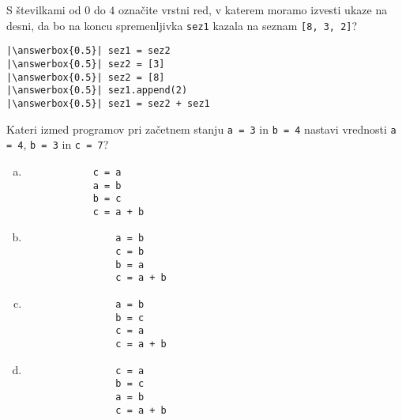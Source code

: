 \documentclass[arhiv, 10pt]{../izpit}
\newcommand{\inlinepy}[1]{\texttt{#1}}
\newcommand{\answerbox}[1]{\framebox{\vphantom{\large M}\hspace{#1cm}}}
\begin{document}
        \naloga*
        \begin{multicols}{2}
        \noindent 
        S številkami od $0$ do $4$ označite vrstni red, v katerem moramo izvesti ukaze na desni, da bo na koncu spremenljivka \inlinepy{sez1} kazala na seznam \inlinepy{[8, 3, 2]}?
    
        \columnbreak
        \noindent
        \begin{verbatim}
|\answerbox{0.5}| sez1 = sez2
|\answerbox{0.5}| sez2 = [3]
|\answerbox{0.5}| sez2 = [8]
|\answerbox{0.5}| sez1.append(2)
|\answerbox{0.5}| sez1 = sez2 + sez1

        \end{verbatim}
        \end{multicols}
    
            
        \naloga*
        
        Kateri izmed programov pri začetnem stanju
            \inlinepy{a = 3} in
            \inlinepy{b = 4}
        nastavi vrednosti
            \inlinepy{a = 4},
            \inlinepy{b = 3} in
            \inlinepy{c = 7}?
    
        \begin{multicols}{4}
        \begin{enumerate}[(a)]
\item 
            \begin{verbatim}
            c = a
            a = b
            b = c
            c = a + b
            \end{verbatim}
        
\item 
                \begin{verbatim}
                a = b
                c = b
                b = a
                c = a + b
                \end{verbatim}
            
\item 
                \begin{verbatim}
                a = b
                b = c
                c = a
                c = a + b
                \end{verbatim}
            
\item 
                \begin{verbatim}
                c = a
                b = c
                a = b
                c = a + b
                \end{verbatim}
            
\end{enumerate}

        \end{multicols}
    
\end{document}
